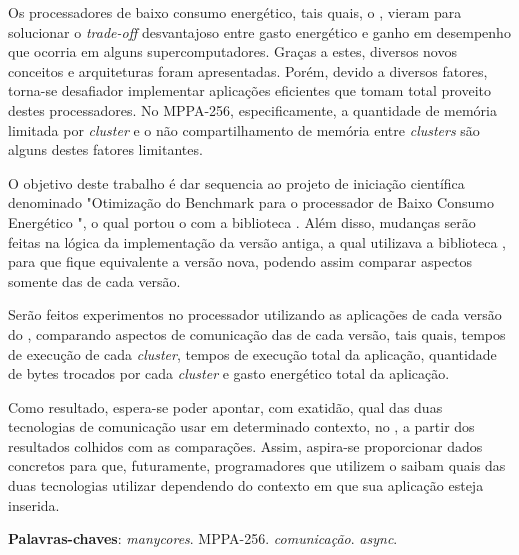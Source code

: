 \documentclass[
    12pt,               %
    openright,          %
    twoside,            %
    a4paper,            %
    english,            %
    brazil,             %
    ]{abntex2}
\begin{document}
\begin{resumo}

Os processadores \manycore de baixo consumo energético, tais quais, o \mppa, vieram para solucionar o \textit{trade-off} desvantajoso entre gasto energético e ganho em desempenho que ocorria em alguns supercomputadores. Graças a estes, diversos novos conceitos e arquiteturas foram apresentadas. Porém, devido a diversos fatores, torna-se desafiador implementar aplicações eficientes que tomam total proveito destes processadores. No MPPA-256, especificamente, a quantidade de memória limitada por \textit{cluster} e o não compartilhamento de memória entre \textit{clusters} são alguns destes fatores limitantes.

O objetivo deste trabalho é dar sequencia ao projeto de iniciação científica denominado "Otimização do Benchmark \capb para o processador \manycore de Baixo Consumo Energético \mppa", o qual portou o \capb com a biblioteca \async. Além disso, mudanças serão feitas na lógica da implementação da versão antiga, a qual utilizava a biblioteca \ipc, para que fique equivalente a versão nova, podendo assim comparar aspectos somente das \apis de cada versão.

Serão feitos experimentos no processador \mppa utilizando as aplicações de cada versão do \capb, comparando aspectos de comunicação das \apis de cada versão, tais quais, tempos de execução de cada \textit{cluster}, tempos de execução total da aplicação, quantidade de bytes trocados por cada \textit{cluster} e gasto energético total da aplicação.

Como resultado, espera-se poder apontar, com exatidão, qual das duas tecnologias de comunicação usar em determinado contexto, no \mppa, a partir dos resultados colhidos com as comparações. Assim, aspira-se proporcionar dados concretos para que, futuramente, programadores que utilizem o \mppa saibam quais das duas tecnologias utilizar dependendo do contexto em que sua aplicação esteja inserida.

    \vspace{\onelineskip}
        
    \noindent
    \textbf{Palavras-chaves}: \textit{manycores}. MPPA-256.
    \textit{comunicação}. \textit{async}.

\end{resumo}


\tableofcontents
\cleardoublepage
\end{document}
